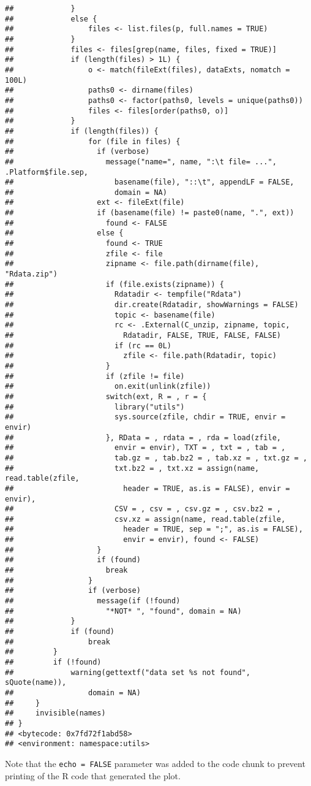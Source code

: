 \documentclass[]{article}
\begin{document}
\begin{verbatim}
##             }
##             else {
##                 files <- list.files(p, full.names = TRUE)
##             }
##             files <- files[grep(name, files, fixed = TRUE)]
##             if (length(files) > 1L) {
##                 o <- match(fileExt(files), dataExts, nomatch = 100L)
##                 paths0 <- dirname(files)
##                 paths0 <- factor(paths0, levels = unique(paths0))
##                 files <- files[order(paths0, o)]
##             }
##             if (length(files)) {
##                 for (file in files) {
##                   if (verbose) 
##                     message("name=", name, ":\t file= ...", .Platform$file.sep, 
##                       basename(file), "::\t", appendLF = FALSE, 
##                       domain = NA)
##                   ext <- fileExt(file)
##                   if (basename(file) != paste0(name, ".", ext)) 
##                     found <- FALSE
##                   else {
##                     found <- TRUE
##                     zfile <- file
##                     zipname <- file.path(dirname(file), "Rdata.zip")
##                     if (file.exists(zipname)) {
##                       Rdatadir <- tempfile("Rdata")
##                       dir.create(Rdatadir, showWarnings = FALSE)
##                       topic <- basename(file)
##                       rc <- .External(C_unzip, zipname, topic, 
##                         Rdatadir, FALSE, TRUE, FALSE, FALSE)
##                       if (rc == 0L) 
##                         zfile <- file.path(Rdatadir, topic)
##                     }
##                     if (zfile != file) 
##                       on.exit(unlink(zfile))
##                     switch(ext, R = , r = {
##                       library("utils")
##                       sys.source(zfile, chdir = TRUE, envir = envir)
##                     }, RData = , rdata = , rda = load(zfile, 
##                       envir = envir), TXT = , txt = , tab = , 
##                       tab.gz = , tab.bz2 = , tab.xz = , txt.gz = , 
##                       txt.bz2 = , txt.xz = assign(name, read.table(zfile, 
##                         header = TRUE, as.is = FALSE), envir = envir), 
##                       CSV = , csv = , csv.gz = , csv.bz2 = , 
##                       csv.xz = assign(name, read.table(zfile, 
##                         header = TRUE, sep = ";", as.is = FALSE), 
##                         envir = envir), found <- FALSE)
##                   }
##                   if (found) 
##                     break
##                 }
##                 if (verbose) 
##                   message(if (!found) 
##                     "*NOT* ", "found", domain = NA)
##             }
##             if (found) 
##                 break
##         }
##         if (!found) 
##             warning(gettextf("data set %s not found", sQuote(name)), 
##                 domain = NA)
##     }
##     invisible(names)
## }
## <bytecode: 0x7fd72f1abd58>
## <environment: namespace:utils>
\end{verbatim}

Note that the \texttt{echo\ =\ FALSE} parameter was added to the code
chunk to prevent printing of the R code that generated the plot.
\end{document}
